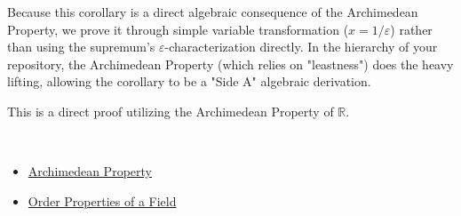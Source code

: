 \begin{remark*}
Because this corollary is a direct algebraic consequence of the Archimedean Property, we prove it through simple variable transformation ($x = 1/\varepsilon$) rather than using the supremum's $\varepsilon$-characterization directly. In the hierarchy of your repository, the Archimedean Property (which relies on "leastness") does the heavy lifting, allowing the corollary to be a "Side A" algebraic derivation.
\end{remark*}

\begin{remark*}
This is a direct proof utilizing the Archimedean Property of $\mathbb{R}$.
\end{remark*}

\begin{remark*}[Dependencies]~\\
\begin{itemize}
  \item \hyperref[thm:archimedean-property]{Archimedean Property}
  \item \hyperref[ax:field-order-properties]{Order Properties of a Field}
\end{itemize}
\end{remark*}

\clearpage
